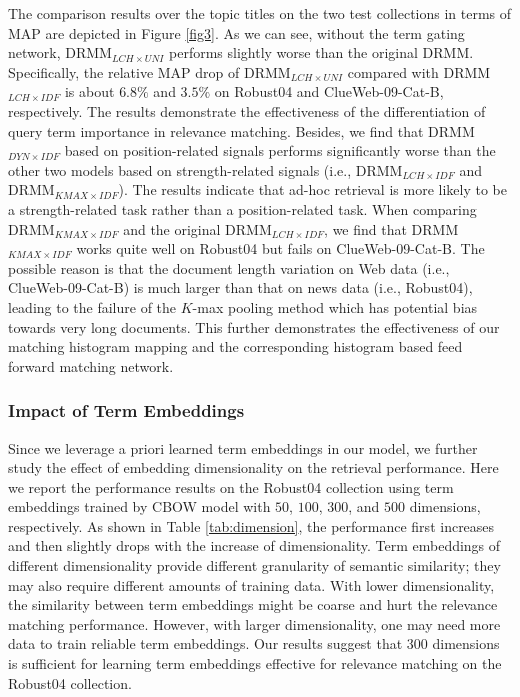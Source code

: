 \documentclass{sig-alternate-05-2015}
\begin{document}
The comparison results over the topic titles on the two test collections in terms of MAP are depicted in Figure \ref{fig3}. As we can see, without the term gating network, DRMM$_{LCH\times UNI}$ performs slightly worse than the original DRMM. Specifically, the relative MAP drop of DRMM$_{LCH\times UNI}$ compared with DRMM$_{LCH\times IDF}$ is about $6.8\%$  and $3.5\%$ on Robust04 and ClueWeb-09-Cat-B, respectively. The results demonstrate the effectiveness of the differentiation of query term importance in relevance matching. Besides, we find that DRMM$_{DYN\times IDF}$ based on position-related signals performs significantly worse than the other two models based on strength-related signals (i.e., DRMM$_{LCH\times IDF}$ and DRMM$_{KMAX\times IDF}$). The results indicate that ad-hoc retrieval is more likely to be a strength-related task rather than a position-related task. When comparing DRMM$_{KMAX\times IDF}$ and the original DRMM$_{LCH\times IDF}$, we find that DRMM$_{KMAX\times IDF}$ works quite well on Robust04 but fails on ClueWeb-09-Cat-B. The possible reason is that the document length variation on Web data (i.e., ClueWeb-09-Cat-B) is much larger than that on news data (i.e., Robust04), leading to the failure of the $K$-max pooling method which has potential bias towards very long documents. This further demonstrates the effectiveness of our matching histogram mapping and the corresponding histogram based feed forward matching network.

\subsubsection{Impact of Term Embeddings}
Since we leverage a priori learned term embeddings in our model, we further study the effect of embedding dimensionality on the retrieval performance. Here we report the performance results on the Robust04 collection using term embeddings trained by CBOW model with $50$, $100$, $300$, and $500$ dimensions, respectively. As shown in Table \ref{tab:dimension}, the performance first increases and then slightly drops with the increase of dimensionality. Term embeddings of different dimensionality provide different granularity of semantic similarity; they may also require different amounts of training data. With lower dimensionality, the similarity between term embeddings might be coarse and hurt the relevance matching performance. However, with larger dimensionality, one may need more data to train reliable term embeddings. Our results suggest that $300$ dimensions is sufficient for learning term embeddings effective for relevance matching on the Robust04 collection.
\end{document}
